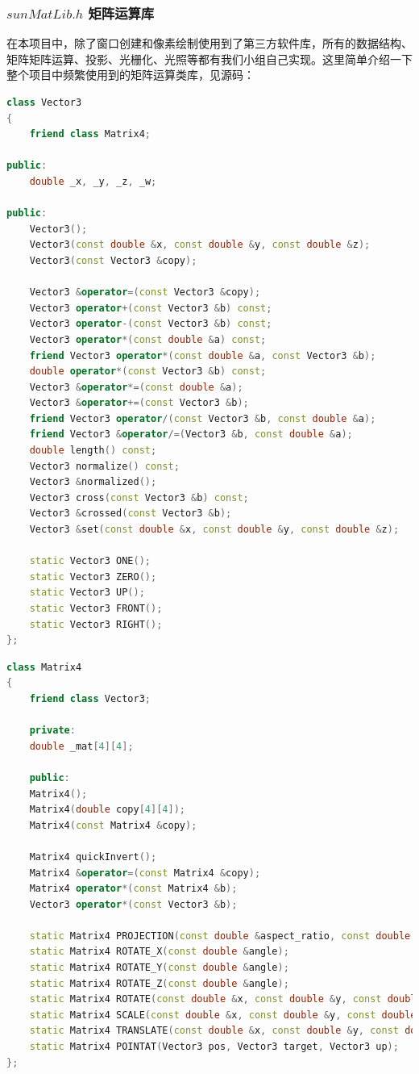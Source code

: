 \documentclass[12pt,oneside,a4paper]{ctexart}
\begin{document}
\subsubsection{$sunMatLib.h$ 矩阵运算库}
在本项目中，除了窗口创建和像素绘制使用到了第三方软件库，所有的数据结构、矩阵矩阵运算、投影、光栅化、光照等都有我们小组自己实现。这里简单介绍一下整个项目中频繁使用到的矩阵运算类库，见源码：
\begin{lstlisting}[language=c++]
class Vector3
{
	friend class Matrix4;
	
public:
	double _x, _y, _z, _w;
	
public:
	Vector3();
	Vector3(const double &x, const double &y, const double &z);
	Vector3(const Vector3 &copy);
	
	Vector3 &operator=(const Vector3 &copy);
	Vector3 operator+(const Vector3 &b) const;
	Vector3 operator-(const Vector3 &b) const;
	Vector3 operator*(const double &a) const;
	friend Vector3 operator*(const double &a, const Vector3 &b);
	double operator*(const Vector3 &b) const;
	Vector3 &operator*=(const double &a);
	Vector3 &operator+=(const Vector3 &b);
	friend Vector3 operator/(const Vector3 &b, const double &a);
	friend Vector3 &operator/=(Vector3 &b, const double &a);
	double length() const;
	Vector3 normalize() const;
	Vector3 &normalized();
	Vector3 cross(const Vector3 &b) const;
	Vector3 &crossed(const Vector3 &b);
	Vector3 &set(const double &x, const double &y, const double &z);
	
	static Vector3 ONE();
	static Vector3 ZERO();
	static Vector3 UP();
	static Vector3 FRONT();
	static Vector3 RIGHT();
};
\end{lstlisting}
\begin{lstlisting}[language=c++]
class Matrix4
{
	friend class Vector3;

	private:
	double _mat[4][4];

	public:
	Matrix4();
	Matrix4(double copy[4][4]);
	Matrix4(const Matrix4 &copy);

	Matrix4 quickInvert();
	Matrix4 &operator=(const Matrix4 &copy);
	Matrix4 operator*(const Matrix4 &b);
	Vector3 operator*(const Vector3 &b);

	static Matrix4 PROJECTION(const double &aspect_ratio, const double &fov_rad, const double &near_panel, const double &far_panel);
	static Matrix4 ROTATE_X(const double &angle);
	static Matrix4 ROTATE_Y(const double &angle);
	static Matrix4 ROTATE_Z(const double &angle);
	static Matrix4 ROTATE(const double &x, const double &y, const double &z);
	static Matrix4 SCALE(const double &x, const double &y, const double &z);
	static Matrix4 TRANSLATE(const double &x, const double &y, const double &z);
	static Matrix4 POINTAT(Vector3 pos, Vector3 target, Vector3 up);
};
\end{lstlisting}
\end{document}

